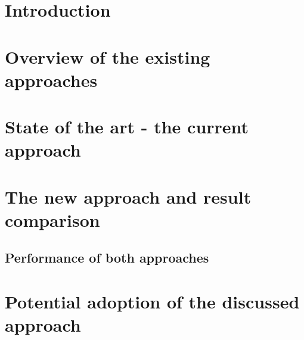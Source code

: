 
\section{Introduction}

\label{Sec:Intro}
\section{Overview of the existing approaches}
\label{Sec:Overview}


\section{State of the art - the current approach}
\label{Sec:State}


\section{The new approach and result comparison}
\label{Sec:Results}

\subsection{Performance of both approaches}


\section{Potential adoption of the discussed approach}



